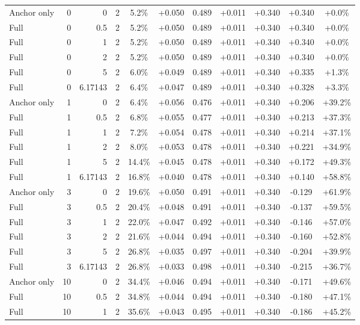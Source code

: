 \begin{table}[htbp]
\begin{tabular}{lrrrccccccc}
Anchor only & 0 & 0 & 2 & 5.2\% & +0.050 & 0.489 & +0.011 & +0.340 & +0.340 & +0.0\% \\
Full & 0 & 0.5 & 2 & 5.2\% & +0.050 & 0.489 & +0.011 & +0.340 & +0.340 & +0.0\% \\
Full & 0 & 1 & 2 & 5.2\% & +0.050 & 0.489 & +0.011 & +0.340 & +0.340 & +0.0\% \\
Full & 0 & 2 & 2 & 5.2\% & +0.050 & 0.489 & +0.011 & +0.340 & +0.340 & +0.0\% \\
Full & 0 & 5 & 2 & 6.0\% & +0.049 & 0.489 & +0.011 & +0.340 & +0.335 & +1.3\% \\
Full & 0 & 6.17143 & 2 & 6.4\% & +0.047 & 0.489 & +0.011 & +0.340 & +0.328 & +3.3\% \\
Anchor only & 1 & 0 & 2 & 6.4\% & +0.056 & 0.476 & +0.011 & +0.340 & +0.206 & +39.2\% \\
Full & 1 & 0.5 & 2 & 6.8\% & +0.055 & 0.477 & +0.011 & +0.340 & +0.213 & +37.3\% \\
Full & 1 & 1 & 2 & 7.2\% & +0.054 & 0.478 & +0.011 & +0.340 & +0.214 & +37.1\% \\
Full & 1 & 2 & 2 & 8.0\% & +0.053 & 0.478 & +0.011 & +0.340 & +0.221 & +34.9\% \\
Full & 1 & 5 & 2 & 14.4\% & +0.045 & 0.478 & +0.011 & +0.340 & +0.172 & +49.3\% \\
Full & 1 & 6.17143 & 2 & 16.8\% & +0.040 & 0.478 & +0.011 & +0.340 & +0.140 & +58.8\% \\
Anchor only & 3 & 0 & 2 & 19.6\% & +0.050 & 0.491 & +0.011 & +0.340 & -0.129 & +61.9\% \\
Full & 3 & 0.5 & 2 & 20.4\% & +0.048 & 0.491 & +0.011 & +0.340 & -0.137 & +59.5\% \\
Full & 3 & 1 & 2 & 22.0\% & +0.047 & 0.492 & +0.011 & +0.340 & -0.146 & +57.0\% \\
Full & 3 & 2 & 2 & 21.6\% & +0.044 & 0.494 & +0.011 & +0.340 & -0.160 & +52.8\% \\
Full & 3 & 5 & 2 & 26.8\% & +0.035 & 0.497 & +0.011 & +0.340 & -0.204 & +39.9\% \\
Full & 3 & 6.17143 & 2 & 26.8\% & +0.033 & 0.498 & +0.011 & +0.340 & -0.215 & +36.7\% \\
Anchor only & 10 & 0 & 2 & 34.4\% & +0.046 & 0.494 & +0.011 & +0.340 & -0.171 & +49.6\% \\
Full & 10 & 0.5 & 2 & 34.8\% & +0.044 & 0.494 & +0.011 & +0.340 & -0.180 & +47.1\% \\
Full & 10 & 1 & 2 & 35.6\% & +0.043 & 0.495 & +0.011 & +0.340 & -0.186 & +45.2\% \\

\end{tabular}
\end{table}

